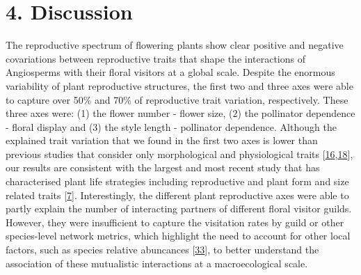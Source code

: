 \documentclass[
  12pt,
  a4paper,
]{article}
\begin{document}
\hypertarget{discussion}{%
\section{4. Discussion}\label{discussion}}

The reproductive spectrum of flowering plants show clear positive and negative covariations between reproductive traits that shape the interactions of Angiosperms with their floral visitors at a global scale. Despite the enormous variability of plant reproductive structures, the first two and three axes were able to capture over 50\% and 70\% of reproductive trait variation, respectively. These three axes were: (1) the flower number - flower size, (2) the pollinator dependence - floral display and (3) the style length - pollinator dependence. Although the explained trait variation that we found in the first two axes is lower than previous studies that consider only morphological and physiological traits {[}\protect\hyperlink{ref-diaz2016}{16},\protect\hyperlink{ref-carmona2021}{18}{]}, our results are consistent with the largest and most recent study that has characterised plant life strategies including reproductive and plant form and size related traits {[}\protect\hyperlink{ref-salguero2016}{7}{]}. Interestingly, the different plant reproductive axes were able to partly explain the number of interacting partners of different floral visitor guilds. However, they were insufficient to capture the visitation rates by guild or other species-level network metrics, which highlight the need to account for other local factors, such as species relative abuncances {[}\protect\hyperlink{ref-bartomeus2016}{33}{]}, to better understand the association of these mutualistic interactions at a macroecological scale.
\end{document}
